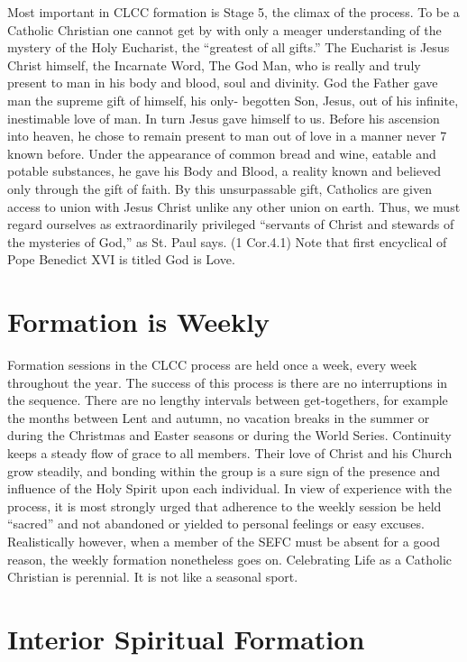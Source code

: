 \documentclass{article}
\begin{document}
Most important in CLCC formation is Stage 5, the climax of the process. To be a
Catholic Christian one cannot get by with only a meager understanding of the
mystery of the Holy Eucharist, the ``greatest of all gifts.'' The Eucharist is
Jesus Christ himself, the Incarnate Word, The God Man, who is really and truly
present to man in his body and blood, soul and divinity. God the Father gave man
the supreme gift of himself, his only- begotten Son, Jesus, out of his infinite,
inestimable love of man. In turn Jesus gave himself to us. Before his ascension
into heaven, he chose to remain present to man out of love in a manner never
7
known before. Under the appearance of common bread and wine, eatable and potable
substances, he gave his Body and Blood, a reality known and believed only
through the gift of faith. By this unsurpassable gift, Catholics are given
access to union with Jesus Christ unlike any other union on earth. Thus, we must
regard ourselves as extraordinarily privileged ``servants of Christ and stewards
of the mysteries of God,'' as St. Paul says. (1 Cor.4.1) Note that first
encyclical of Pope Benedict XVI is titled God is Love.

\section{Formation is Weekly}

Formation sessions in the CLCC process are held once a week, every week
throughout the year. The success of this process is there are no interruptions
in the sequence. There are no lengthy intervals between get-togethers, for
example the months between Lent and autumn, no vacation breaks in the summer or
during the Christmas and Easter seasons or during the World Series. Continuity
keeps a steady flow of grace to all members. Their love of Christ and his Church
grow steadily, and bonding within the group is a sure sign of the presence and
influence of the Holy Spirit upon each individual. In view of experience with
the process, it is most strongly urged that adherence to the weekly session be
held ``sacred'' and not abandoned or yielded to personal feelings or easy
excuses. Realistically however, when a member of the SEFC must be absent for a
good reason, the weekly formation nonetheless goes on. Celebrating Life as a
Catholic Christian is perennial. It is not like a seasonal sport.

\section{Interior Spiritual Formation}
\end{document}
